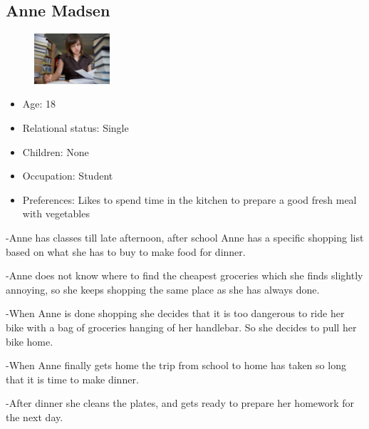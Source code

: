 \subsection{Anne Madsen}
\begin{figure}[H]
	\includegraphics[width=0.25\textwidth]{Grafik/FoodPlanner/PersonaAnneMadsen}
	\label{PersonaHenrikJensen}
\end{figure}
\begin{itemize}
	\item Age: 18
	\item Relational status: Single
	\item Children: None
	\item Occupation: Student
	\item Preferences: Likes to spend time in the kitchen to prepare a good fresh meal with vegetables
\end{itemize}
-Anne has classes till late afternoon, after school Anne has a specific shopping list based on what she has to buy to make food for dinner.

-Anne does not know where to find the cheapest groceries which she finds slightly annoying, so she keeps shopping the same place as she has always done.

-When Anne is done shopping she decides that it is too dangerous to ride her bike with a bag of groceries hanging of her handlebar. So she decides to pull her bike home.

-When Anne finally gets home the trip from school to home has taken so long that it is time to make dinner.

-After dinner she cleans the plates, and gets ready to prepare her homework for the next day. 
